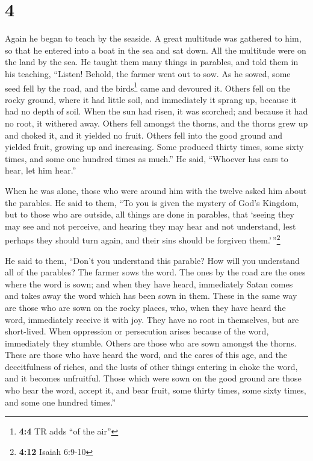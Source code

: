 \hypertarget{section-3}{%
\section{4}\label{section-3}}

 Again he began to teach by the seaside. A great multitude
was gathered to him, so that he entered into a boat in the sea and sat
down. All the multitude were on the land by the sea.  He
taught them many things in parables, and told them in his teaching,
 ``Listen! Behold, the farmer went out to sow.
 As he sowed, some seed fell by the road, and the
birds\footnote{\textbf{4:4} TR adds ``of the air''} came and devoured
it.  Others fell on the rocky ground, where it had little
soil, and immediately it sprang up, because it had no depth of soil.
 When the sun had risen, it was scorched; and because it
had no root, it withered away.  Others fell amongst the
thorns, and the thorns grew up and choked it, and it yielded no fruit.
 Others fell into the good ground and yielded fruit,
growing up and increasing. Some produced thirty times, some sixty times,
and some one hundred times as much.''  He said, ``Whoever
has ears to hear, let him hear.''

 When he was alone, those who were around him with the
twelve asked him about the parables.  He said to them,
``To you is given the mystery of God's Kingdom, but to those who are
outside, all things are done in parables,  that `seeing
they may see and not perceive, and hearing they may hear and not
understand, lest perhaps they should turn again, and their sins should
be forgiven them.'\,''\footnote{\textbf{4:12} Isaiah 6:9-10}

 He said to them, ``Don't you understand this parable?
How will you understand all of the parables?  The farmer
sows the word.  The ones by the road are the ones where
the word is sown; and when they have heard, immediately Satan comes and
takes away the word which has been sown in them.  These
in the same way are those who are sown on the rocky places, who, when
they have heard the word, immediately receive it with joy.
 They have no root in themselves, but are short-lived.
When oppression or persecution arises because of the word, immediately
they stumble.  Others are those who are sown amongst the
thorns. These are those who have heard the word,  and the
cares of this age, and the deceitfulness of riches, and the lusts of
other things entering in choke the word, and it becomes unfruitful.
 Those which were sown on the good ground are those who
hear the word, accept it, and bear fruit, some thirty times, some sixty
times, and some one hundred times.''

